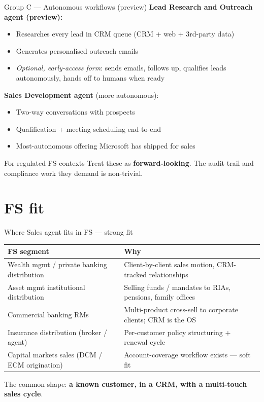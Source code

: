 \documentclass[11pt,aspectratio=169]{beamer}
\newcommand{\hl}[1]{\textbf{\textcolor{accentteal}{#1}}}
\begin{document}
\begin{frame}{Group C --- Autonomous workflows (preview)}
  \textbf{Lead Research and Outreach agent (preview):}
  \begin{itemize}
    \item Researches every lead in CRM queue (CRM + web + 3rd-party data)
    \item Generates personalised outreach emails
    \item \textit{Optional, early-access form}: sends emails, follows up, qualifies leads autonomously, hands off to humans when ready
  \end{itemize}

  \medskip
  \textbf{Sales Development agent} (more autonomous):
  \begin{itemize}
    \item Two-way conversations with prospects
    \item Qualification + meeting scheduling end-to-end
    \item Most-autonomous offering Microsoft has shipped for sales
  \end{itemize}

  \vfill
  \begin{alertblock}{For regulated FS contexts}
    Treat these as \hl{forward-looking}. The audit-trail and compliance work they demand is non-trivial.
  \end{alertblock}
\end{frame}

\section{FS fit}

\begin{frame}{Where Sales agent fits in FS --- strong fit}
  \centering\footnotesize
  \begin{tabular}{lp{}}
    \toprule
    \textbf{FS segment} & \textbf{Why} \\
    \midrule
    Wealth mgmt / private banking distribution & Client-by-client sales motion, CRM-tracked relationships \\
    Asset mgmt institutional distribution      & Selling funds / mandates to RIAs, pensions, family offices \\
    Commercial banking RMs                     & Multi-product cross-sell to corporate clients; CRM is the OS \\
    Insurance distribution (broker / agent)    & Per-customer policy structuring + renewal cycle \\
    Capital markets sales (DCM / ECM origination) & Account-coverage workflow exists --- soft fit \\
    \bottomrule
  \end{tabular}

  \vfill
  \raggedright The common shape: \hl{a known customer, in a CRM, with a multi-touch sales cycle}.
\end{frame}
\end{document}
